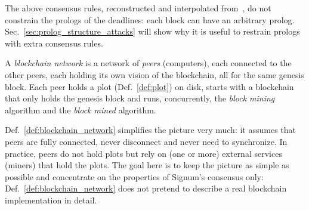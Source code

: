 %
The above consensus rules, reconstructed and interpolated
from~\cite{SignumPlotting,SignumSource},
do not constrain the prologs of the deadlines:
each block can have an arbitrary prolog. Sec.~\ref{sec:prolog_structure_attacks}
will show why it is useful to restrain prologs with extra consensus rules.
%
\begin{definition}\label{def:blockchain_network}
  A \emph{blockchain network} is a
  network of \emph{peers} (computers), each connected to the other peers,
  each holding its own vision of the blockchain, all for the same genesis block.
  Each peer holds a plot (Def.~\ref{def:plot}) on disk, starts with
  a blockchain that only holds the genesis block and runs,
  concurrently, the \emph{block mining} algorithm
  and the \emph{block mined} algorithm.
\end{definition}
%
Def.~\ref{def:blockchain_network} simplifies the picture very much:
it assumes that peers are fully connected, never disconnect and never need to synchronize.
In practice, peers do not hold plots but rely on (one or more)
external services (miners) that hold the plots.
The goal here is to keep the picture as simple as possible and concentrate on the properties of
Signum's consensus only: Def.~\ref{def:blockchain_network} does not pretend
to describe a real blockchain implementation in detail.

